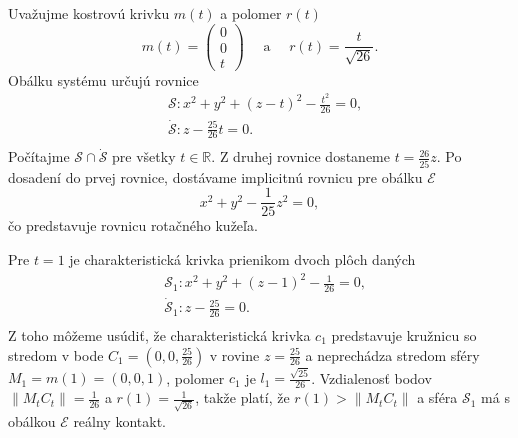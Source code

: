\begin{example} 
\label{exam:obalka_sfer}
Uvažujme kostrovú krivku $m(t)$ a polomer $r(t)$
$$ 
m(t) = \begin{pmatrix} 0 \\ 0 \\ t \end{pmatrix} \quad \text{ a } \quad r(t) = \frac{t}{\sqrt{26}}.
$$
Obálku systému určujú rovnice
\begin{align*}
&\mathcal{S} \colon x^2 + y^2 + (z - t)^2 - \frac{t^2}{26} = 0, \\
&\mathcal{\dot{S}} \colon z - \frac{25}{26}t = 0. \\
\end{align*}
Počítajme $ \mathcal{S} \cap \mathcal{\dot{S}} $ pre všetky $t \in \mathbb{R}.$ Z druhej rovnice dostaneme $t = \frac{26}{25}z$. Po dosadení do prvej rovnice, dostávame implicitnú rovnicu pre obálku $\mathcal{E}$
$$
x^2 + y^2 - \frac{1}{25}z^2 = 0,
$$
čo predstavuje rovnicu rotačného kužeľa.

Pre $t = 1$ je charakteristická krivka prienikom dvoch plôch daných
\begin{align*}
&\mathcal{S}_1 \colon x^2 + y^2 + (z - 1)^2 - \frac{1}{26} = 0, \\
&\mathcal{\dot{S}}_1 \colon z - \frac{25}{26} = 0. \\
\end{align*}
Z toho môžeme usúdiť, že charakteristická krivka $c_1$ predstavuje kružnicu so stredom v bode $C_1 = (0, 0, \frac{25}{26})$ v rovine $z = \frac{25}{26}$ a neprechádza stredom sféry $M_1 = m(1) = (0,0,1)$, polomer $c_1$ je $l_{1} = \frac{\sqrt{25}}{26}$. Vzdialenosť bodov $ \|M_tC_t\| = \frac{1}{26}$ a $r(1)= \frac{1}{\sqrt{26}}$, takže platí, že $r(1) > \|M_tC_t\|$ a sféra $\mathcal{S}_1$ má s obálkou $\mathcal{E}$ reálny kontakt.


\end{example}
